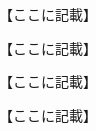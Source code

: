 \documentclass{ltjsarticle}
\begin{document}
\maketitle

\SecZ{}



【ここに記載】



\SecB{}

【ここに記載】

\SecC{}

【ここに記載】



\SecB{}

【ここに記載】

\Ijo
\end{document}
